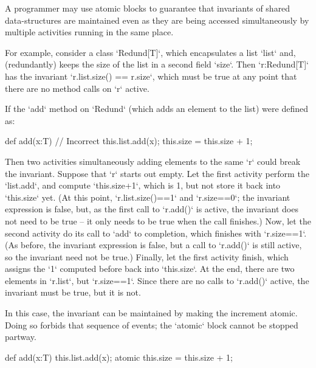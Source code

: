 A programmer may use atomic blocks to guarantee that invariants of
shared data-structures are maintained even as they are being accessed
simultaneously by multiple activities running in the same place.  

For example, consider a class \xcd`Redund[T]`, which encapsulates a list
\xcd`list` and, (redundantly) keeps the size of the list in a second field
\xcd`size`.  Then \xcd`r:Redund[T]` has the invariant 
\xcd`r.list.size() == r.size`, which must be true at any point that there are
no method calls on \xcd`r` active.

If the \xcd`add` method on \xcd`Redund` (which adds an element to the list) 
were defined as: 
\begin{xten}
def add(x:T) { // Incorrect
  this.list.add(x);
  this.size = this.size + 1;
}
\end{xten}
Then two activities simultaneously adding elements to the same \xcd`r` could break the
invariant.  Suppose that \xcd`r` starts out empty.  Let the first activity
perform the \xcd`list.add`, and compute \xcd`this.size+1`, which is 1, but not store it
back into \xcd`this.size` yet.  
(At this point, \xcd`r.list.size()==1` and \xcd`r.size==0`; the invariant
expression is false, but, as the first call to \xcd`r.add()` is active, the
invariant does not need to be true -- it only needs to be true when the
call finishes.)
Now, let the second activity do its call to
\xcd`add` to completion, which finishes with \xcd`r.size==1`.  
(As before, the invariant expression is false, but a call to \xcd`r.add()` is
still active, so the invariant need not be true.)
Finally, let
the first activity finish, which assigns the \xcd`1` computed before back into
\xcd`this.size`.  At the end, there are two elements in \xcd`r.list`, but
\xcd`r.size==1`. Since there are no calls to \xcd`r.add()` active, the
invariant must be true, but it is not.

In this case, the invariant can be maintained by making the increment atomic.
Doing so forbids that sequence of events; the \xcd`atomic` block cannot be
stopped partway.  
\begin{xten}
def add(x:T) { 
  this.list.add(x);
  atomic { this.size = this.size + 1; }
}
\end{xten}



